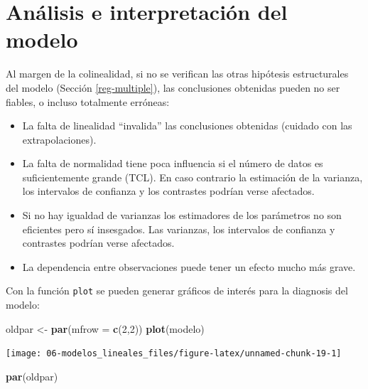 \documentclass[
  spanish,
]{book}
\newenvironment{Shaded}{\begin{snugshade}}{\end{snugshade}}
\newcommand{\DataTypeTok}[1]{\textcolor[rgb]{0.13,0.29,0.53}{#1}}
\newcommand{\DecValTok}[1]{\textcolor[rgb]{0.00,0.00,0.81}{#1}}
\newcommand{\KeywordTok}[1]{\textcolor[rgb]{0.13,0.29,0.53}{\textbf{#1}}}
\newcommand{\NormalTok}[1]{#1}
\newcommand{\StringTok}[1]{\textcolor[rgb]{0.31,0.60,0.02}{#1}}
\theoremstyle{break}
\theoremstyle{definition}
\theoremstyle{definition}
\theoremstyle{definition}
\theoremstyle{remark}
\begin{document}
\hypertarget{analisis-reg-multiple}{%
\section{Análisis e interpretación del modelo}\label{analisis-reg-multiple}}

Al margen de la colinealidad, si no se verifican las otras hipótesis estructurales del modelo (Sección \ref{reg-multiple}), las conclusiones obtenidas pueden no ser fiables, o incluso totalmente erróneas:

\begin{itemize}
\item
  La falta de linealidad ``invalida'' las conclusiones obtenidas
  (cuidado con las extrapolaciones).
\item
  La falta de normalidad tiene poca influencia si el
  número de datos es suficientemente grande (TCL). En caso contrario
  la estimación de la varianza, los intervalos de confianza y los
  contrastes podrían verse afectados.
\item
  Si no hay igualdad de varianzas los estimadores de los
  parámetros no son eficientes pero sí insesgados. Las varianzas, los
  intervalos de confianza y contrastes podrían verse afectados.
\item
  La dependencia entre observaciones puede tener un efecto mucho
  más grave.
\end{itemize}

Con la función \texttt{plot} se pueden generar gráficos de interés para la diagnosis del modelo:

\begin{Shaded}
\begin{Highlighting}[]
\NormalTok{oldpar <-}\StringTok{ }\KeywordTok{par}\NormalTok{(}\DataTypeTok{mfrow =} \KeywordTok{c}\NormalTok{(}\DecValTok{2}\NormalTok{,}\DecValTok{2}\NormalTok{))}
\KeywordTok{plot}\NormalTok{(modelo)}
\end{Highlighting}
\end{Shaded}

\begin{center}\texttt{[image: 06-modelos\_lineales\_files/figure-latex/unnamed-chunk-19-1]} \end{center}

\begin{Shaded}
\begin{Highlighting}[]
\KeywordTok{par}\NormalTok{(oldpar)}
\end{Highlighting}
\end{Shaded}
\end{document}
